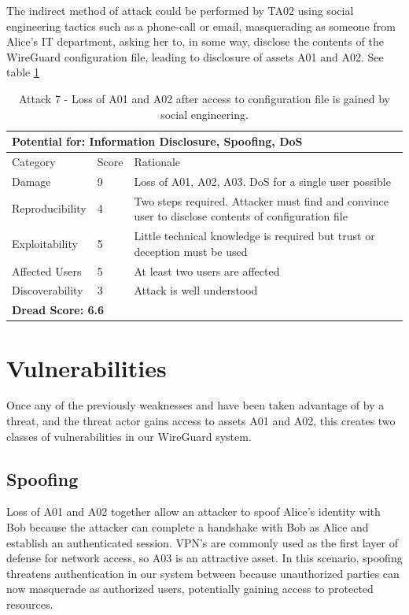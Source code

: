 \documentclass [11pt, proquest] {uwthesis}[2020/02/24]
\begin{document}
The indirect method of attack could be performed by TA02 using social engineering tactics such as a phone-call or email, masquerading as someone from Alice's IT department, asking her to, in some way, disclose the contents of the WireGuard configuration file, leading to disclosure of assets A01 and A02.
See table \ref{attack7-ref} 

\begin{table}[H]
\label{attack7-ref}
\begin{tabular}{|m{3cm}|m{.9cm}|p{27em} |}
\multicolumn{3}{l}{Potential for: Information Disclosure, Spoofing, DoS}                   \\
\hline
Category & Score & Rationale \\
\hline
Damage          & 9     & Loss of A01, A02, A03. DoS for a single user possible            \\
\hline
Reproducibility & 4     & Two steps required. Attacker must find and convince user to disclose contents of configuration file    \\
\hline
Exploitability & 5      & Little technical knowledge is required but trust or deception must be used   \\
\hline
Affected Users  & 5     & At least two users are affected                      \\
\hline
Discoverability & 3     & Attack is well understood  \\
\hline
\multicolumn{3}{l}{\textbf{Dread Score: 6.6}} 
\end{tabular}
\caption{Attack 7 - Loss of A01 and A02 after access to configuration file is gained by social engineering.}
\end{table}

\section{Vulnerabilities}
Once any of the previously weaknesses and have been taken advantage of by a threat, and the threat actor gains access to assets A01 and A02, this creates two classes of vulnerabilities in our WireGuard system.

\subsection{Spoofing}
\label{spoofing}
Loss of A01 and A02 together allow an attacker to spoof Alice's identity with Bob because the attacker can complete a handshake with Bob as Alice and establish an authenticated session. VPN's are commonly used as the first layer of defense for network access, so A03 is an attractive asset.
In this scenario, spoofing threatens authentication in our system between because unauthorized parties can now masquerade as authorized users, potentially gaining access to protected resources. 
\end{document}
